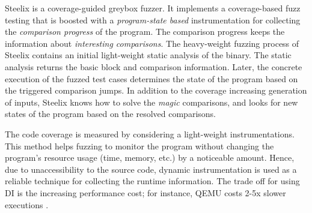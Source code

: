 Steelix \cite{li2017steelix} is a coverage-guided greybox fuzzer. It implements a coverage-based fuzz testing that is boosted with a \textit{program-state based} instrumentation for collecting the \textit{comparison progress} of the program. The comparison progress keeps the information about \textit{interesting comparisons}. The heavy-weight fuzzing process of Steelix contains an initial light-weight static analysis of the binary. The static analysis returns the basic block and comparison information. Later, the concrete execution of the fuzzed test cases determines the state of the program based on the triggered comparison jumps. In addition to the coverage increasing generation of inputs, Steelix knows how to solve the \textit{magic} comparisons, and looks for new states of the program based on the resolved comparisons.

The code coverage is measured by considering a light-weight instrumentations. This method helps fuzzing to monitor the program without changing the program's resource usage (time, memory, etc.) by a noticeable amount. Hence, due to unaccessibility to the source code, dynamic instrumentation is used as a reliable technique for collecting the runtime information. The trade off for using DI is the increasing performance cost; for instance, QEMU costs 2-5x slower executions \cite{afl_qemu}.

